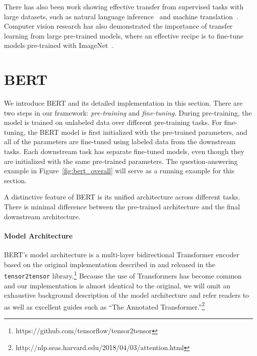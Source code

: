\documentclass[11pt,a4paper]{article}
\begin{document}
There has also been work showing effective transfer from supervised tasks with large datasets, such as natural language inference~\cite{conneau-EtAl:2017:EMNLP2017} and machine translation~\cite{mccann-etal:2017:_learn_trans}. 
Computer vision research has also demonstrated the importance of transfer learning from large pre-trained models, where an effective recipe is to fine-tune models pre-trained with ImageNet~\cite{imagenet_cvpr09, yosinski2014transferable}. 








\section{BERT}
\label{sec:bert}

We introduce BERT and its detailed implementation in this section. There are two steps in our framework: {\em pre-training} and {\em fine-tuning}. 
During pre-training, the model is trained on unlabeled data over different pre-training tasks.
For fine-tuning, the BERT model is first initialized with the pre-trained parameters, and all of the parameters are fine-tuned using labeled data from the downstream tasks. 
Each downstream task has separate fine-tuned models, even though they
are initialized with the same pre-trained parameters. The question-answering example in Figure~\ref{fig:bert_overall} will serve as a running example for this section.

A distinctive feature of BERT is its unified architecture across different tasks.
There is minimal difference between the pre-trained architecture and the final downstream architecture.

\paragraph{Model Architecture}
BERT's model architecture is a multi-layer bidirectional Transformer encoder based on the original implementation described in \citet{vaswani-etal:2017:_atten} and released in the {\tt tensor2tensor} library.\footnote{https://github.com/tensorflow/tensor2tensor} Because the use of Transformers has become common and our implementation is almost identical to the original, we will omit an exhaustive background description of the model architecture and refer readers to \citet{vaswani-etal:2017:_atten} as well as excellent guides such as ``The Annotated Transformer.''\footnote{http://nlp.seas.harvard.edu/2018/04/03/attention.html}
\end{document}
